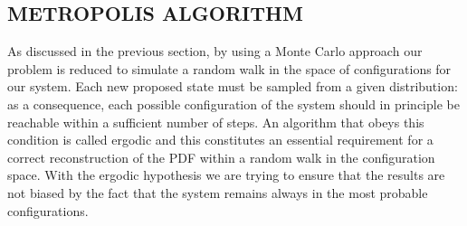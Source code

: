 \subsection{METROPOLIS ALGORITHM}
As discussed in the previous section, by using a Monte Carlo approach our problem is reduced to simulate a random walk in the space of configurations for our system. Each new proposed state must be sampled from a given distribution: as a consequence, each possible configuration of the system should in principle be reachable within a sufficient number of steps. An algorithm that obeys this condition is called ergodic and this constitutes an essential requirement for a correct reconstruction of the PDF within a random walk in the configuration space. With the ergodic hypothesis we are trying to ensure that the results are not biased by the fact that the system remains always in the most probable configurations. 

